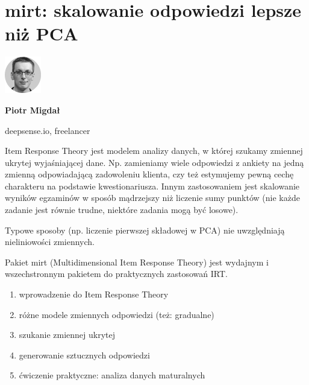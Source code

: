 \documentclass[\main/boa.tex]{subfiles}
\begin{document}
\section{mirt: skalowanie odpowiedzi lepsze niż PCA}
\begin{minipage}[t]{0.915\textwidth}
	\center     
    \includegraphics[width=60px]{img/workshops/czarno_biale/pmigdal_crop.png} 
\end{minipage}

\begin{minipage}{0.915\textwidth}
\centering
{\bf {} Piotr Migdał}
\end{minipage}

\vskip 0.3cm

\begin{affiliations}
\begin{minipage}{0.915\textwidth}
\centering
\large deepsense.io, freelancer  \\[2pt]
\end{minipage}
\end{affiliations}

\vskip 0.8cm

\opiswarsztatu Item Response Theory jest modelem analizy danych, w której szukamy zmiennej ukrytej wyjaśniającej dane. Np. zamieniamy wiele odpowiedzi z ankiety na jedną zmienną odpowiadającą zadowoleniu klienta, czy też estymujemy pewną cechę charakteru na podstawie kwestionariusza. Innym zastosowaniem jest skalowanie wyników egzaminów w sposób mądrzejszy niż liczenie sumy punktów (nie każde zadanie jest równie trudne, niektóre zadania mogą być losowe).

Typowe sposoby (np. liczenie pierwszej składowej w PCA) nie uwzględniają nieliniowości zmiennych.

Pakiet mirt (Multidimensional Item Response Theory) jest wydajnym i wszechstronnym pakietem do praktycznych zastosowań IRT.

\planwarsztatu
\begin{enumerate}
\item wprowadzenie do Item Response Theory
\item różne modele zmiennych odpowiedzi (też: gradualne)
\item szukanie zmiennej ukrytej
\item generowanie sztucznych odpowiedzi
\item ćwiczenie praktyczne: analiza danych maturalnych
\end{enumerate}	 
\end{document}

